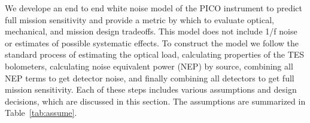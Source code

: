 \documentclass[]{spie}  %
\begin{document}
We develope an end to end white noise model of the PICO instrument to predict full mission sensitivity and 
provide a metric by which to evaluate optical, mechanical, and mission design tradeoffs.  This model does not include 
1/f noise or estimates of possible systematic effects.  %
To construct the model we follow the standard process\cite{suzuki2013_thesis,aubin2013_thesis} of estimating the 
optical load, calculating properties of the TES bolometers, calculating noise equivalent power (NEP) by source, 
combining all NEP terms to get detector noise, and finally combining all detectors to get full mission sensitivity.  
Each of these steps includes various assumptions and design decisions, 
which are discussed in this section.  The assumptions are summarized in Table~\ref{tab:assume}.
\end{document}
